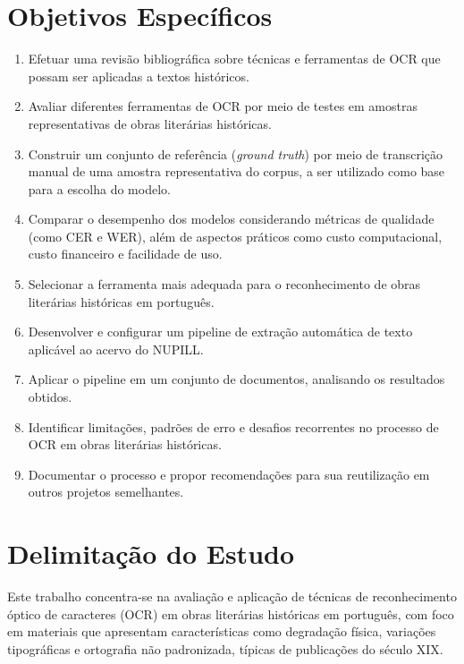 \documentclass[
  12pt,
  oneside,
  a4paper,
  chapter=TITLE,
  section=TITLE,
  english,
  brazil
]{abntex2}
\begin{document}
\section{Objetivos Específicos}

\begin{enumerate}
    \item Efetuar uma revisão bibliográfica sobre técnicas e ferramentas de OCR que
    possam ser aplicadas a textos históricos.

    \item Avaliar diferentes ferramentas de OCR por meio de testes em amostras
    representativas de obras literárias históricas.

    \item Construir um conjunto de referência (\textit{ground truth}) por meio de
    transcrição manual de uma amostra representativa do corpus, a ser utilizado como
    base para a escolha do modelo.

    \item Comparar o desempenho dos modelos considerando métricas de qualidade (como
    CER e WER), além de aspectos práticos como custo computacional, custo financeiro e
    facilidade de uso.

    \item Selecionar a ferramenta mais adequada para o reconhecimento de obras
    literárias históricas em português.

    \item Desenvolver e configurar um pipeline de extração automática de texto
    aplicável ao acervo do NUPILL.

    \item Aplicar o pipeline em um conjunto de documentos, analisando os resultados
    obtidos.

    \item Identificar limitações, padrões de erro e desafios recorrentes no processo de
    OCR em obras literárias históricas.

    \item Documentar o processo e propor recomendações para sua reutilização em outros
    projetos semelhantes.
\end{enumerate}

\section{Delimitação do Estudo}

Este trabalho concentra-se na avaliação e aplicação de técnicas de reconhecimento
óptico de caracteres (OCR) em obras literárias históricas em português, com foco em
materiais que apresentam características como degradação física, variações tipográficas
e ortografia não padronizada, típicas de publicações do século XIX.
\end{document}
